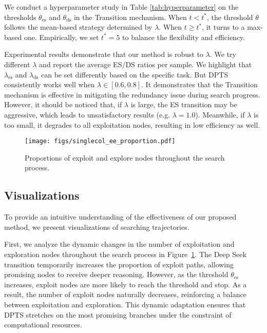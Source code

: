We conduct a hyperparameter study in Table \ref{tab:hyperparameter} on the thresholds $\theta_\mathrm{es}$ and $\theta_\mathrm{ds}$ in the Transition mechanism. 
When $t < t^*$, the threshold $\theta$ follows the mean-based strategy determined by $\lambda$. When $t \geq t^*$, it turns to a max-based one. 
Empirically, we set  $t^* = 5$  to balance the flexibility and efficiency. 

Experimental results demonstrate that our method is robust to $\lambda$. We try different $\lambda$ and report the average ES/DS ratios per sample. 
We highlight that $\lambda_\mathrm{es}$ and $\lambda_\mathrm{ds}$ can be set differently based on the specific task. But DPTS consistently works well when $\lambda\in[0.6, 0.8]$. It demonstrates that the Transition mechanism is effective in mitigating the redundancy issue during search progress. 
However, it should be noticed that, if $\lambda$ is large, the ES transition may be aggressive, which leads to unsatisfactory results (e.g. $\lambda=1.0$). Meanwhile, if $\lambda$ is too small, it degrades to all exploitation nodes, resulting in low efficiency as well. 

\begin{figure}
    \centering
    \texttt{[image: figs/singlecol\_ee\_proportion.pdf]}
    \vspace{-0.1in}
    \caption{Proportions of exploit and explore nodes throughout the search process. }
    \label{fig:ee_proportion}
    \vspace{-0.12in}
\end{figure}

\subsection{Visualizations}

To provide an intuitive understanding of the effectiveness of our proposed method, we present visualizations of searching trajectories. %

First, we analyze the dynamic changes in the number of exploitation and exploration nodes throughout the search process in Figure~\ref{fig:ee_proportion}. The Deep Seek transition temporarily increases the proportion of exploit paths, allowing promising nodes to receive deeper reasoning. However, as the threshold $\theta_\mathrm{es}$ increases, exploit nodes are more likely to reach the threshold and stop. As a result, the number of exploit nodes naturally decreases, reinforcing a balance between exploitation and exploration. This dynamic adaptation ensures that DPTS stretches on the most promising branches under the constraint of computational resources. 

